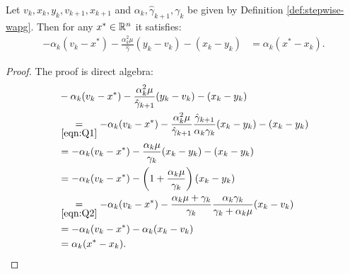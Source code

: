 \documentclass[12pt]{article}
\begin{document}
        \begin{lemma}\label{lemma:ineq-q3}
        Let $v_k, x_k, y_k, v_{k + 1}, x_{k + 1}$ and $\alpha_k, \hat \gamma_{k + 1}, \gamma_{k}$ be given by Definition \ref{def:stepwise-wapg}. 
        Then for any $x^* \in \mathbb R^n$ it satisfies: 
        \begin{align}
            - \alpha_k(v_k - x^*) - \frac{\alpha_k^2 \mu}{\hat \gamma}(y_k - v_k) - (x_k - y_k)
            &= \alpha_k(x^* - x_k). 
            \tag{Q3}\label{eqn:Q3}
        \end{align}
    \end{lemma}
    \begin{proof}
        The proof is direct algebra: 
        \begin{align*}
            &  
            - \alpha_k(v_k - x^*) - \frac{\alpha_k^2 \mu}{\hat \gamma_{k + 1}}(y_k - v_k) - (x_k - y_k)
            \\
            & \underset{\eqref{eqn:Q1}}{=}
            -\alpha_k(v_k - x^*) -
            \frac{\alpha_k^2\mu}{\hat \gamma_{k + 1}}
            \frac{\hat \gamma_{k + 1}}{\alpha_k \gamma_k}(x_k - y_k)
            - (x_k - y_k) 
            \\
            &= 
            -\alpha_k(v_k - x^*) -
            \frac{\alpha_k \mu}{\gamma_k}(x_k - y_k)
            - (x_k - y_k) 
            \\
            &= 
            -\alpha_k(v_k - x^*) -
            \left(
                1 + \frac{\alpha_k \mu}{\gamma_k}
            \right)(x_k - y_k)
            \\
            &\underset{\eqref{eqn:Q2}}{=}
            -\alpha_k(v_k - x^*) - 
            \frac{\alpha_k \mu + \gamma_k}{\gamma_k}
            \frac{\alpha_k \gamma_k}{\gamma_k + \alpha_k \mu}(x_k - v_k)
            \\
            &= 
            -\alpha_k(v_k - x^*)
            - \alpha_k(x_k - v_k)
            \\
            &= \alpha_k(x^* - x_k). 
        \end{align*}
    \end{proof}
\end{document}
